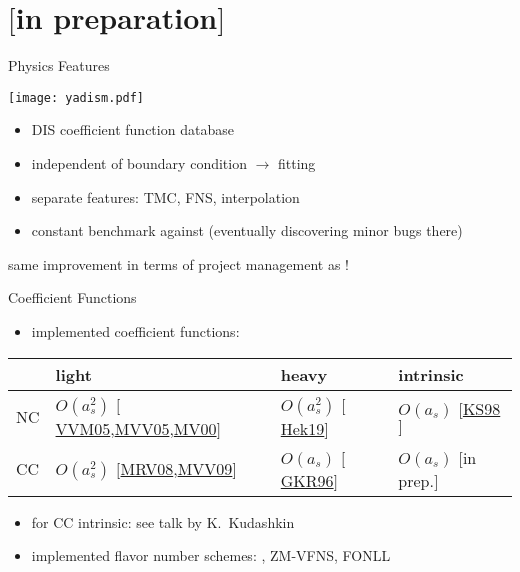 \documentclass[10pt, usepdftitle=false]{beamer}
\providecommand{\iRef}[1]{{\color{mLightGreen}\small $[$#1$]$}}
\begin{document}
\section{\yadism{} \iRef{in preparation}}

\begin{frame}{\yadism{} Physics Features}
	\begin{center}
		\texttt{[image: yadism.pdf]}
	\end{center}

	\begin{itemize}
		\item DIS coefficient function database
		\item independent of boundary condition $\to$ \pdf{} fitting
		\item separate features: TMC, FNS, interpolation
		\item constant benchmark against \apfel{} (eventually discovering minor bugs there)
	\end{itemize}

	\vspace{10pt}
	same improvement in terms of project management as \eko{}!
\end{frame}

\begin{frame}{Coefficient Functions}
	\begin{itemize}
		\item implemented coefficient functions:
	\end{itemize}
	\begin{center}
		\begin{tabular}{l|l|l|l}
			& light & heavy & intrinsic\\\hline
			NC & $O(a_s^2)$ \iRef{\href{https://doi.org/10.1016/j.nuclphysb.2005.06.020}{VVM05},\href{https://doi.org/10.1016/j.physletb.2004.11.063}{MVV05},\href{https://doi.org/10.1016/S0550-3213(00)00045-6}{MV00}} & $O(a_s^2)$ \iRef{\href{https://arxiv.org/abs/1910.01536}{Hek19}} & $O(a_s)$ \iRef{\href{https://doi.org/10.1103/PhysRevD.58.094035}{KS98}}\\
			CC & $O(a_s^2)$ \iRef{\href{https://doi.org/10.1016/j.nuclphysb.2007.09.022}{MRV08},\href{https://doi.org/10.1016/j.nuclphysb.2009.01.001}{MVV09}} & $O(a_s)$ \iRef{\href{https://doi.org/10.1016/0370-2693(96)00456-X}{GKR96}} & $O(a_s)$ \iRef{in prep.}
		\end{tabular}
	\end{center}
	\begin{itemize}
		\item for CC intrinsic: see talk by K.~Kudashkin
		\item implemented flavor number schemes: \ffns{}, {\abbrev ZM-VFNS}, {\abbrev FONLL}
	\end{itemize}
\end{frame}
\end{document}
